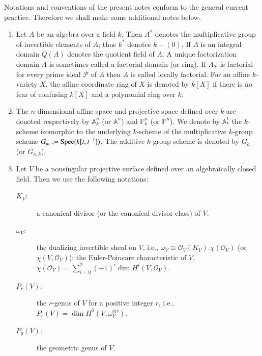 Notations and conventions of the present notes conform to the general
current practice. Therefore we shall make some additional notes below.
\begin{enumerate}
\item Let $A$ be an algebra over a field $k$. Then $A^{\ast}$ denotes
  the multiplicative group of invertible elements of $A$; thus
  $k^{\ast}$ denotes $k-(0)$. If $A$ is an integral domain $Q(A)$
  denotes the quotient field of $A$. A unique factorization domain $A$
  is sometimes called a factorial domain (or ring). If
  $A_{\mathscr{P}}$ is factorial for every prime ideal $\mathscr{P}$
  of $A$ then $A$ is called locally factorial. For an affine
  $k$-variety $X$, the affine coordinate ring of $X$ is denoted by
  $k[X]$ if there is no fear of confusing $k[X]$ and a polynomial ring
  over $k$.

\item The $n$-dimensional affine space and projective space defined
  over $k$ are denoted respectively by $\mathbb{A}^{n}_{k}$ (or
  $\mathbb{A}^{n}$) and $\mathbb{P}^{n}_{k}$ (or $\mathbb{P}^{n}$). We
  denote by $\mathbb{A}^{1}_{\ast}$ the $k$-scheme isomorphic to the
  underlying $k$-scheme of the multiplicative $k$-group scheme
  $G_{m}:=\operatorname{Spec} (k[t,t^{-1}])$. The additive $k$-group scheme is
  denoted by $G_{a}$ (or $G_{a,k}$).

\item Let $V$ be a nonsingular projective surface defined over an
  algebraically closed field. Then we use the following notations:

\begin{description}
\item[$K_{V}$:] a canonical divisor (or the canonical divisor class)
  of $V$.

\item[$\omega_{V}$:] the dualizing invertible sheaf on $V$, i.e.,
  $\omega_{V}\cong \mathscr{O}_{V}(K_{V})$.\break  $\chi(\mathscr{O}_{V})$
  (or $\chi(V,\mathscr{O}_{V})$): the Euler-Poincare characteristic of
  $V$, $\chi(\mathscr{O}_{V})=\sum\limits^{2}_{i=0}(-1)^{i}\dim
  H^{i}(V,\mathscr{O}_{V})$.\pageoriginale

\item[$P_{r}(V)$:] the $r$-genus of $V$ for a positive integer $r$,
  i.e., $P_{r}(V)=\dim H^{0}(V,\omega^{\otimes r}_{V})$.

\item[$P_{g}(V)$:]  the geometric genus of $V$.


\end{description}
\end{enumerate}
